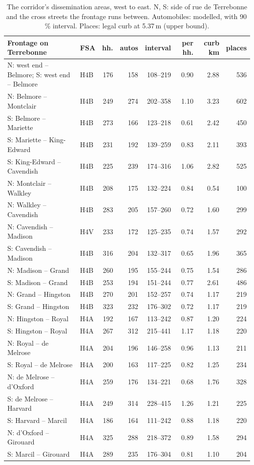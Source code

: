 \documentclass[11pt,a4paper]{article}
\begin{document}
{\small
\begin{longtable}{@{}p{5.6cm}lrrrrrr@{}}
\caption{The corridor\textquoteright{}s dissemination areas, west to east. N, S: side of rue de Terrebonne and the cross streets the frontage runs between. Automobiles: modelled, with 90\,\% interval. Places: legal curb at 5.37\,m (upper bound).}\label{tab:da}\\\toprule
Frontage on Terrebonne & FSA & hh. & autos & interval & per hh. & curb km & places \\\midrule\endhead
N: west end -- Belmore; S: west end -- Belmore & H4B & 176 & 158 & 108--219 & 0.90 & 2.88 & 536 \\
N: Belmore -- Montclair & H4B & 249 & 274 & 202--358 & 1.10 & 3.23 & 602 \\
S: Belmore -- Mariette & H4B & 273 & 166 & 123--218 & 0.61 & 2.42 & 450 \\
S: Mariette -- King-Edward & H4B & 231 & 192 & 139--259 & 0.83 & 2.11 & 393 \\
S: King-Edward -- Cavendish & H4B & 225 & 239 & 174--316 & 1.06 & 2.82 & 525 \\
N: Montclair -- Walkley & H4B & 208 & 175 & 132--224 & 0.84 & 0.54 & 100 \\
N: Walkley -- Cavendish & H4B & 283 & 205 & 157--260 & 0.72 & 1.60 & 299 \\
N: Cavendish -- Madison & H4V & 233 & 172 & 125--235 & 0.74 & 1.57 & 292 \\
S: Cavendish -- Madison & H4B & 316 & 204 & 132--317 & 0.65 & 1.96 & 365 \\
N: Madison -- Grand & H4B & 260 & 195 & 155--244 & 0.75 & 1.54 & 286 \\
S: Madison -- Grand & H4B & 253 & 194 & 151--244 & 0.77 & 2.61 & 486 \\
N: Grand -- Hingston & H4B & 270 & 201 & 152--257 & 0.74 & 1.17 & 219 \\
S: Grand -- Hingston & H4B & 323 & 232 & 176--302 & 0.72 & 1.17 & 219 \\
N: Hingston -- Royal & H4A & 192 & 167 & 113--242 & 0.87 & 1.20 & 224 \\
S: Hingston -- Royal & H4A & 267 & 312 & 215--441 & 1.17 & 1.18 & 220 \\
N: Royal -- de Melrose & H4A & 204 & 196 & 146--258 & 0.96 & 1.13 & 211 \\
S: Royal -- de Melrose & H4A & 200 & 163 & 117--225 & 0.82 & 1.25 & 234 \\
N: de Melrose -- d'Oxford & H4A & 259 & 176 & 134--221 & 0.68 & 1.76 & 328 \\
S: de Melrose -- Harvard & H4A & 249 & 314 & 228--415 & 1.26 & 1.21 & 225 \\
S: Harvard -- Marcil & H4A & 186 & 164 & 111--242 & 0.88 & 1.18 & 220 \\
N: d'Oxford -- Girouard & H4A & 325 & 288 & 218--372 & 0.89 & 1.58 & 294 \\
S: Marcil -- Girouard & H4A & 289 & 235 & 176--304 & 0.81 & 1.10 & 204 \\
\bottomrule\end{longtable}}
\end{document}
